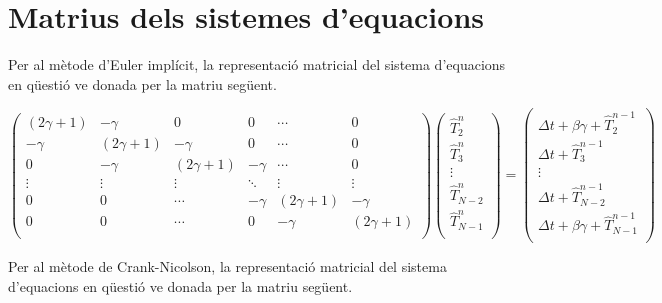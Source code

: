 \documentclass[11pt]{article}
\begin{document}
\section{Matrius dels sistemes d'equacions} \label{subsec: matrius}

Per al mètode d'Euler implícit, la representació matricial del sistema d'equacions en qüestió ve donada per la matriu següent.

\begin{equation}
  \begin{pmatrix}
    (2\gamma + {1}) & {-\gamma} & {0} & {0} & \cdots & {0} \\
    {-\gamma} & (2\gamma + {1}) & {-\gamma} & {0} & \cdots & {0} \\
    {0} & {-\gamma} & (2\gamma + {1}) & {-\gamma} & \cdots & {0} \\
    \vdots & \vdots & \vdots & \ddots & \vdots & \vdots \\
    {0} & {0} & \cdots & {-\gamma} & (2\gamma + {1}) & {-\gamma} \\
    {0} & {0} & \cdots & {0} & {-\gamma} & (2\gamma + {1}) \\
  \end{pmatrix}
  \begin{pmatrix}
    \hat{T}_{2}^{n} \\
    \hat{T}_{3}^{n} \\
    \vdots \\
    \hat{T}_{N-2}^{n} \\
    \hat{T}_{N-1}^{n} \\
  \end{pmatrix}
  =
  \begin{pmatrix}
    \Delta t + \beta\gamma + \hat{T}^{n-1}_2 \\
    \Delta t + \hat{T}^{n-1}_3 \\
    \vdots \\
    \Delta t + \hat{T}^{n-1}_{N-2} \\
    \Delta t + \beta\gamma + \hat{T}^{n-1}_{N-1} \\
  \end{pmatrix}
  \label{matriu implicit}
\end{equation}

Per al mètode de Crank-Nicolson, la representació matricial del sistema d'equacions en qüestió ve donada per la matriu següent.
\end{document}

